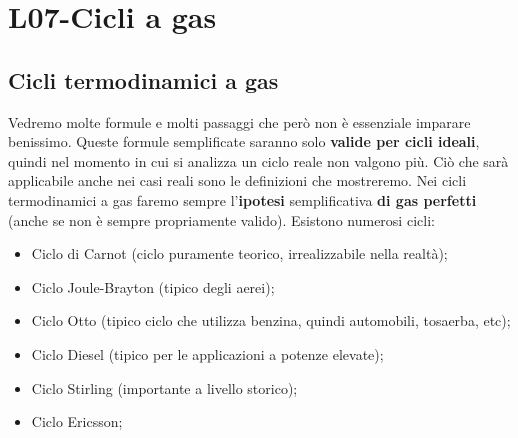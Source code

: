\section{L07-Cicli a gas}
\subsection{Cicli termodinamici a gas}
Vedremo molte formule e molti passaggi che però non è essenziale imparare benissimo. Queste formule semplificate saranno solo \textbf{valide per cicli ideali}, quindi nel momento in cui si analizza un ciclo reale non valgono più. Ciò che sarà applicabile anche nei casi reali sono le definizioni che mostreremo.\newline
\newline
Nei cicli termodinamici a gas faremo sempre l'\textbf{ipotesi} semplificativa \textbf{di gas perfetti} (anche se non è sempre propriamente valido).\newline
\newline
Esistono numerosi cicli:
\begin{itemize}
    \item Ciclo di Carnot (ciclo puramente teorico, irrealizzabile nella realtà);
    \item Ciclo Joule-Brayton (tipico degli aerei);
    \item Ciclo Otto (tipico ciclo che utilizza benzina, quindi automobili, tosaerba, etc);
    \item Ciclo Diesel (tipico per le applicazioni a potenze elevate);
    \item Ciclo Stirling (importante a livello storico);
    \item Ciclo Ericsson;
\end{itemize}

